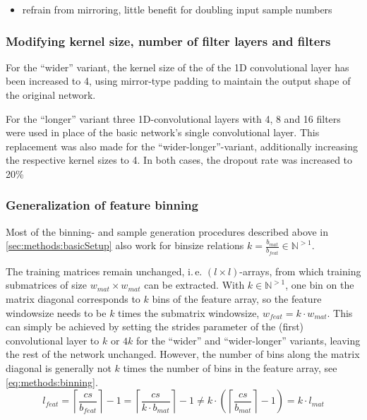 \begin{itemize}
 \item refrain from mirroring, little benefit for doubling input sample numbers
\end{itemize}

\subsubsection{Modifying kernel size, number of filter layers and filters}
For the ``wider'' variant, the kernel size of the of the 1D convolutional layer has been increased to 4,
using mirror-type padding to maintain the output shape of the original network.

For the ``longer'' variant three 1D-convolutional layers with 4, 8 and 16 filters 
were used in place of the basic network's single convolutional layer.
This replacement was also made for the ``wider-longer''-variant, 
additionally increasing the respective kernel sizes to 4.
In both cases, the dropout rate was increased to 20\%


\subsubsection{Generalization of feature binning} \label{sec:methods:inputBinning}
Most of the binning- and sample generation procedures described above in \cref{sec:methods:basicSetup} 
also work for binsize relations $k=\frac{b_{mat}}{b_{feat}} \in \mathbb{N}^{>1}$.

The training matrices remain unchanged, i.\,e. $(l \times l)$-arrays, from which training submatrices of size  $w_{mat} \times w_{mat} $
can be extracted. 
With $k \in \mathbb{N}^{>1}$, one bin on the matrix diagonal corresponds to $k$ bins of the feature array,
so the feature windowsize needs to be $k$ times the submatrix windowsize, $w_{feat} = k \cdot w_{mat}$.
This can simply be achieved by setting the strides parameter of the (first) convolutional layer to $k$ or $4k$ for the ``wider'' and ``wider-longer'' variants, 
leaving the rest of the network unchanged.
However, the number of bins along the matrix diagonal is generally not $k$ times the number of bins in the feature array,
see \cref{eq:methods:binning}.
\begin{equation}
 l_{feat} = \left \lceil{\frac{cs}{b_{feat}}}\right \rceil -1 
                = \left \lceil{\frac{cs}{k \cdot b_{mat}}}\right \rceil -1 
                \not = k \cdot (\left \lceil{\frac{cs}{ b_{mat}}}\right \rceil -1)
                = k \cdot l_{mat} \label{eq:methods:binning}
\end{equation}

